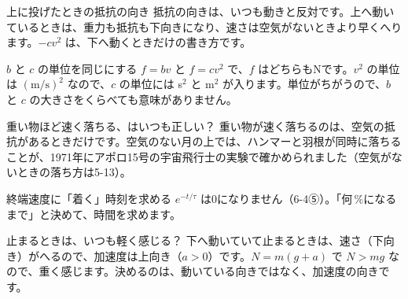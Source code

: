 \begin{tsumazuki}{上に投げたときの抵抗の向き}
抵抗の向きは、いつも動きと反対です。上へ動いているときは、重力も抵抗も下向きになり、速さは空気がないときより早くへります。$-cv^2$ は、下へ動くときだけの書き方です。
\end{tsumazuki}

\begin{tsumazuki}{$b$ と $c$ の単位を同じにする}
$f=bv$ と $f=cv^2$ で、$f$ はどちらもNです。$v^2$ の単位は $(\text{m/s})^2$ なので、$c$ の単位には s$^2$ と m$^2$ が入ります。単位がちがうので、$b$ と $c$ の大きさをくらべても意味がありません。
\end{tsumazuki}

\begin{tsumazuki}{重い物ほど速く落ちる、はいつも正しい？}
重い物が速く落ちるのは、空気の抵抗があるときだけです。空気のない月の上では、ハンマーと羽根が同時に落ちることが、1971年にアポロ15号の宇宙飛行士の実験で確かめられました（空気がないときの落ち方は5-13）。
\end{tsumazuki}

\begin{tsumazuki}{終端速度に「着く」時刻を求める}
$e^{-t/\tau}$ は0になりません（6-4⑤）。「何\,\%になるまで」と決めて、時間を求めます。
\end{tsumazuki}

\begin{tsumazuki}{止まるときは、いつも軽く感じる？}
下へ動いていて止まるときは、速さ（下向き）がへるので、加速度は上向き（$a>0$）です。$N=m(g+a)$ で $N>mg$ なので、重く感じます。決めるのは、動いている向きではなく、加速度の向きです。
\end{tsumazuki}

